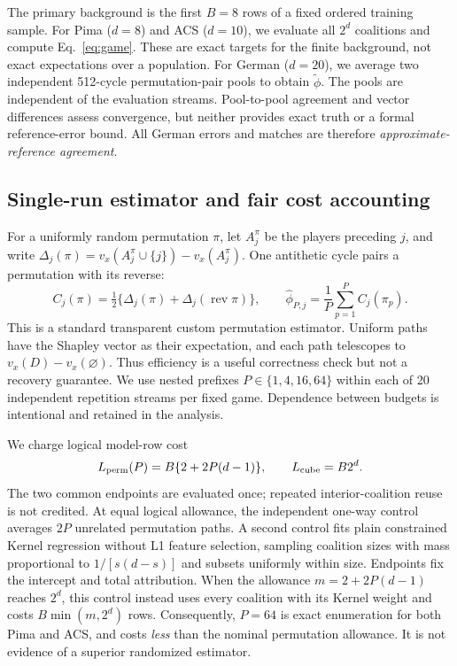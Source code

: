 \documentclass{article}
\begin{document}
The primary background is the first $B=8$ rows of a fixed ordered training sample. For Pima ($d=8$) and ACS ($d=10$), we evaluate all $2^d$ coalitions and compute Eq.~\eqref{eq:game}. These are exact targets for the finite background, not exact expectations over a population. For German ($d=20$), we average two independent 512-cycle permutation-pair pools to obtain $\widetilde\phi$. The pools are independent of the evaluation streams. Pool-to-pool agreement and vector differences assess convergence, but neither provides exact truth or a formal reference-error bound. All German errors and matches are therefore \emph{approximate-reference agreement}.

\subsection{Single-run estimator and fair cost accounting}
For a uniformly random permutation $\pi$, let $A_j^\pi$ be the players preceding $j$, and write $\Delta_j(\pi)=v_x(A_j^\pi\cup\{j\})-v_x(A_j^\pi)$. One antithetic cycle pairs a permutation with its reverse:
\begin{equation}
 C_j(\pi)=\tfrac12\{\Delta_j(\pi)+\Delta_j(\operatorname{rev}\pi)\},\qquad
 \widehat\phi_{P,j}=\frac1P\sum_{p=1}^P C_j(\pi_p).
 \label{eq:estimator}
\end{equation}
This is a standard transparent custom permutation estimator. Uniform paths have the Shapley vector as their expectation, and each path telescopes to $v_x(D)-v_x(\varnothing)$. Thus efficiency is a useful correctness check but not a recovery guarantee. We use nested prefixes $P\in\{1,4,16,64\}$ within each of 20 independent repetition streams per fixed game. Dependence between budgets is intentional and retained in the analysis.

We charge logical model-row cost
\begin{equation}
 L_{\rm perm}(P)=B\{2+2P(d-1)\},\qquad L_{\rm cube}=B2^d.
 \label{eq:cost}
\end{equation}
The two common endpoints are evaluated once; repeated interior-coalition reuse is not credited. At equal logical allowance, the independent one-way control averages $2P$ unrelated permutation paths. A second control fits plain constrained Kernel regression without L1 feature selection, sampling coalition sizes with mass proportional to $1/[s(d-s)]$ and subsets uniformly within size. Endpoints fix the intercept and total attribution. When the allowance $m=2+2P(d-1)$ reaches $2^d$, this control instead uses every coalition with its Kernel weight and costs $B\min(m,2^d)$ rows. Consequently, $P=64$ is exact enumeration for both Pima and ACS, and costs \emph{less} than the nominal permutation allowance. It is not evidence of a superior randomized estimator.
\end{document}

